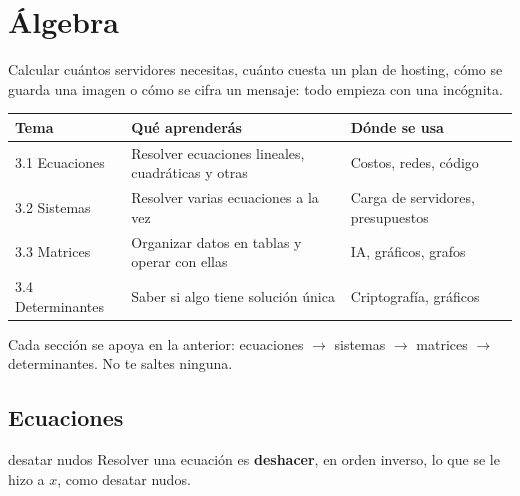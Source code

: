 \chapter{\'Algebra}
\label{cap:algebra}

\begin{tmsistemas}
Calcular cu\'antos servidores necesitas, cu\'anto cuesta un plan de hosting, c\'omo se guarda una imagen o c\'omo se cifra un mensaje: todo empieza con una inc\'ognita.
\end{tmsistemas}

\begin{center}
\begin{tabular}{|p{3.3cm}|p{5.4cm}|p{4.4cm}|}
\hline
\rowcolor{tmAzulClaro}\textbf{Tema} & \textbf{Qu\'e aprender\'as} & \textbf{D\'onde se usa}\\ \hline
3.1 Ecuaciones & Resolver ecuaciones lineales, cuadr\'aticas y otras & Costos, redes, c\'odigo\\ \hline
3.2 Sistemas & Resolver varias ecuaciones a la vez & Carga de servidores, presupuestos\\ \hline
3.3 Matrices & Organizar datos en tablas y operar con ellas & IA, gr\'aficos, grafos\\ \hline
3.4 Determinantes & Saber si algo tiene soluci\'on \'unica & Criptograf\'ia, gr\'aficos\\ \hline
\end{tabular}
\end{center}

\begin{tmtip}Cada secci\'on se apoya en la anterior: ecuaciones $\to$ sistemas $\to$ matrices $\to$ determinantes. No te saltes ninguna.\end{tmtip}

\section{Ecuaciones}
\label{sec:3-1}

\begin{tmconcepto}{desatar nudos}
Resolver una ecuaci\'on es \textbf{deshacer}, en orden inverso, lo que se le hizo a $x$, como desatar nudos.
\end{tmconcepto}


